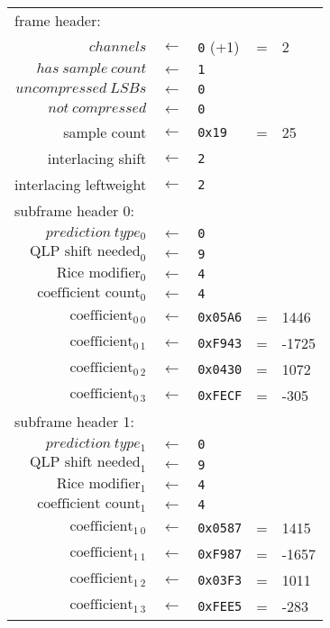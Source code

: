 \begin{table}[h]
{
\begin{tabular}{rclcl}
\multicolumn{5}{l}{frame header:} \\
$channels$ & $\leftarrow$ & \texttt{0} (+1) &=& 2 \\
$has~sample~count$ & $\leftarrow$ & \texttt{1} \\
$uncompressed~LSBs$ & $\leftarrow$ & \texttt{0} \\
$not~compressed$ & $\leftarrow$ & \texttt{0} \\
sample count & $\leftarrow$ & \texttt{0x19} &=& 25 \\
interlacing shift & $\leftarrow$ & \texttt{2} \\
interlacing leftweight & $\leftarrow$ & \texttt{2} \\
\hline
\multicolumn{5}{l}{subframe header 0:} \\
$prediction~type_0$ & $\leftarrow$ & \texttt{0} \\
$\text{QLP shift needed}_0$ & $\leftarrow$ & \texttt{9} \\
$\text{Rice modifier}_0$ & $\leftarrow$ & \texttt{4} \\
$\text{coefficient count}_0$ & $\leftarrow$ & \texttt{4} \\
$\text{coefficient}_{0~0}$ & $\leftarrow$ & \texttt{0x05A6} &=& 1446 \\
$\text{coefficient}_{0~1}$ & $\leftarrow$ & \texttt{0xF943} &=& -1725 \\
$\text{coefficient}_{0~2}$ & $\leftarrow$ & \texttt{0x0430} &=& 1072 \\
$\text{coefficient}_{0~3}$ & $\leftarrow$ & \texttt{0xFECF} &=& -305 \\
\hline
\multicolumn{5}{l}{subframe header 1:} \\
$prediction~type_1$ & $\leftarrow$ & \texttt{0} \\
$\text{QLP shift needed}_1$ & $\leftarrow$ & \texttt{9} \\
$\text{Rice modifier}_1$ & $\leftarrow$ & \texttt{4} \\
$\text{coefficient count}_1$ & $\leftarrow$ & \texttt{4} \\
$\text{coefficient}_{1~0}$ & $\leftarrow$ & \texttt{0x0587} &=& 1415 \\
$\text{coefficient}_{1~1}$ & $\leftarrow$ & \texttt{0xF987} &=& -1657 \\
$\text{coefficient}_{1~2}$ & $\leftarrow$ & \texttt{0x03F3} &=& 1011 \\
$\text{coefficient}_{1~3}$ & $\leftarrow$ & \texttt{0xFEE5} &=& -283 \\
\end{tabular}
}
\end{table}

